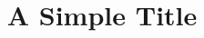 \documentclass[11pt]{beamer}
\title{A Simple Title}
\subtitle{}
\author{}
\institute{}
\date{}
\begin{document}
\begin{frame}\titlepage\end{frame}
\end{document}
